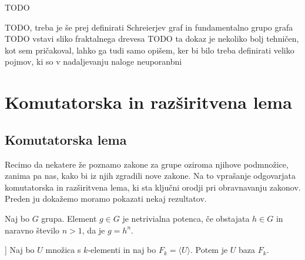 \documentclass[mat1, tisk]{fmfdelo}
\begin{document}
\begin{definicija}
\label{def_fundamentalna_grupa_grafa}
TODO
\end{definicija}    

\begin{dokaz}
    TODO, treba je še prej definirati Schreierjev graf in fundamentalno grupo grafa
        TODO vstavi sliko fraktalnega drevesa
    TODO ta dokaz je nekoliko bolj tehničen, kot sem pričakoval, lahko ga tudi samo opišem, ker bi bilo treba definirati veliko pojmov,
    ki so v nadaljevanju naloge neuporanbni
\end{dokaz}



\section{Komutatorska in razširitvena lema}
\subsection{Komutatorska lema}

Recimo da nekatere že poznamo zakone za grupe oziroma njihove podmnožice, zanima pa nas, kako bi iz njih zgradili nove zakone. Na to vprašanje odgovarjata komutatorska in razširitvena lema,
ki sta ključni orodji pri obravnavanju zakonov. Preden ju dokažemo moramo pokazati nekaj rezultatov.

\begin{definicija}
\label{def_netrivialna_potenca}
Naj bo $G$ grupa. Element $g \in  G$ je netrivialna potenca, če obstajata $h \in G$ in naravno število $n > 1$, da je $g = h^{n}$.
\end{definicija}

\begin{lema}[\cite{Lyndon_Schupp_2015}[str.~8, trditev 2.7]]
\label{lem_uporaba_nielsen}
Naj bo $U$ množica s $k$-elementi in naj bo $F_k = \langle U \rangle$. Potem je $U$ baza $F_k$.  
\end{lema}
\end{document}

